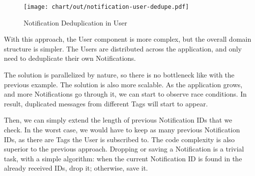 \begin{figure}[h]
  \centering
  \texttt{[image: chart/out/notification-user-dedupe.pdf]}
  \caption{Notification Deduplication in User}
  \label{fig:notification-user-dedupe}
\end{figure}

With this approach,
the User component is more complex,
but the overall domain structure is simpler.
The Users are distributed across the application,
and only need to deduplicate their own Notifications.

The solution is parallelized by nature,
so there is no bottleneck
like with the previous example.
The solution is also more scalable.
As the application grows,
and more Notifications go through it,
we can start to observe race conditions.
In result,
duplicated messages from different Tags
will start to appear.

Then, we can simply extend the length of
previous Notification IDs that we check.
In the worst case,
we would have to keep as many previous
Notification IDs,
as there are Tags the User is subscribed to.
The code complexity is also superior
to the previous approach.
Dropping or saving a Notification is a trivial task,
with a simple algorithm:
when the current Notification ID is found in the
already received IDs, drop it; otherwise, save it.
